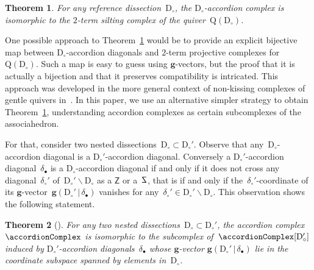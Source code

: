 \documentclass{amsart}
\newtheorem{theorem}{Theorem}%
\theoremstyle{definition}
\renewcommand{\b}[1]{\mathbf{#1}} %
\newcommand{\ssm}{\smallsetminus} %
\newcommand{\dissection}{\mathrm{D}} %
\newcommand{\sign}[3]{\varepsilon \big( {#1} \in {#2}\;|\;{#3} \big)} %
\newcommand{\SSS}{\reflectbox{$\mathsf{Z}$}} %
\newcommand{\ZZZ}{\mathsf{Z}} %
\newcommand{\gvector}[2]{\mathbf{g}(#1 \,|\, #2)} %
\newcommand{\quiver}{\mathrm{Q}} %
\begin{document}
\begin{theorem}
\label{thm:bijectionAccordionComplexSiltingComplex}
For any reference dissection~$\dissection_\circ$, the $\dissection_\circ$-accordion complex is isomorphic to the $2$-term silting complex of the quiver~$\quiver(\dissection_\circ)$.
\end{theorem}

One possible approach to Theorem~\ref{thm:bijectionAccordionComplexSiltingComplex} would be to provide an explicit bijective map between $\dissection_\circ$-accordion diagonals and $2$-term projective complexes for~$\quiver(\dissection_\circ)$.
Such a map is easy to guess using $\b{g}$-vectors, but the proof that it is actually a bijection and that it preserves compatibility is intricated.
This approach was developed in the more general context of non-kissing complexes of gentle quivers in~\cite{PaluPilaudPlamondon}.
In this paper, we use an alternative simpler strategy to obtain Theorem~\ref{thm:bijectionAccordionComplexSiltingComplex}, understanding accordion complexes as certain subcomplexes of the associahedron.

For that, consider two nested dissections~$\dissection_\circ \subset \dissection_\circ'$.
Observe that any~$\dissection_\circ$-accordion diagonal is a $\dissection_\circ'$-accordion diagonal.
Conversely a $\dissection_\circ'$-accordion diagonal~$\delta_\bullet$ is a $\dissection_\circ$-accordion diagonal if and only if it does not cross any diagonal~$\delta_\circ'$ of~$\dissection_\circ' \ssm \dissection_\circ$ as a $\ZZZ$ or a~$\SSS$, that is if and only if the~$\delta_\circ'$-coordinate of its $\b{g}$-vector~$\gvector{\dissection_\circ'}{\delta_\bullet}$ vanishes for any~$\delta_\circ' \in \dissection_\circ' \ssm \dissection_\circ$.
This observation shows the following statement.

\begin{theorem}[\cite{MannevillePilaud-accordion}]
\label{thm:contractDiagonals}
For any two nested dissections~$\dissection_\circ \subset \dissection_\circ'$, the accordion complex~$\accordionComplex$ is isomorphic to the subcomplex of~$\accordionComplex[\dissection_\circ']$ induced by $\dissection_\circ'$-accordion diagonals~$\delta_\bullet$ whose $\b{g}$-vector $\gvector{\dissection_\circ'}{\delta_\bullet}$ lie in the coordinate subspace spanned by elements in~$\dissection_\circ$.
\end{theorem}
\end{document}
